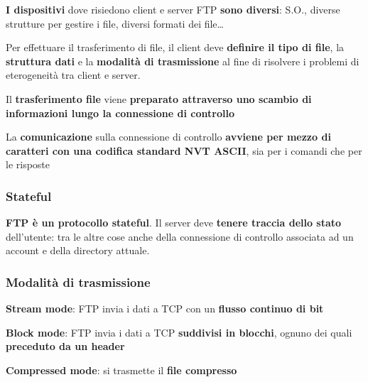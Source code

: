 \documentclass[10pt]{article}
\begin{document}
\begin{list}{}{}
\item \textbf{I dispositivi} dove risiedono client e server FTP \textbf{sono diversi}: S.O., diverse strutture per gestire i file, diversi formati dei file\ldots
\item Per effettuare il trasferimento di file, il client deve \textbf{definire il tipo di file}, la \textbf{struttura dati} e la \textbf{modalità di trasmissione} al fine di risolvere i problemi di eterogeneità tra client e server.
\item Il \textbf{trasferimento file} viene \textbf{preparato attraverso uno scambio di informazioni lungo la connessione di controllo}
\item La \textbf{comunicazione} sulla connessione di controllo \textbf{avviene per mezzo di caratteri con una codifica standard NVT ASCII}, sia per i comandi che per le risposte
\item \subsubsection{Stateful} \textbf{FTP è un protocollo stateful}. Il server deve \textbf{tenere traccia dello stato} dell'utente: tra le altre cose anche della connessione di controllo associata ad un account e della directory attuale.
\item \subsubsection{Modalità di trasmissione}
\begin{list}{}{}
\item \textbf{Stream mode}: FTP invia i dati a TCP con un \textbf{flusso continuo di bit}
\item \textbf{Block mode}: FTP invia i dati a TCP \textbf{suddivisi in blocchi}, ognuno dei quali \textbf{preceduto da un header}
\item \textbf{Compressed mode}: si trasmette il \textbf{file compresso}
\end{list}
\end{list}
\end{document}
